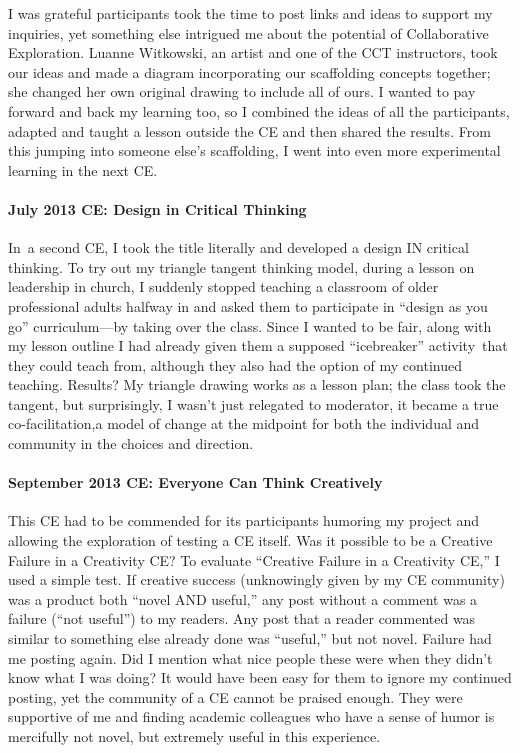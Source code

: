 I was grateful participants took the time to post links and ideas to
support my inquiries, yet something else intrigued me about the
potential of Collaborative Exploration. Luanne Witkowski, an artist and
one of the CCT instructors, took our ideas and made a diagram
incorporating our scaffolding concepts together; she changed her own
original drawing to include all of ours. I wanted to pay forward and
back my learning too, so I combined the ideas of all the participants,
adapted and taught a lesson outside the CE and then shared the results.
From this jumping into someone else's scaffolding, I went into even more
experimental learning in the next CE.

\paragraph{July 2013 CE: Design in Critical Thinking}

In~a second CE, I took the title literally and developed a design IN
critical thinking. To try out my triangle tangent thinking model, during
a lesson on leadership in church, I suddenly stopped teaching a
classroom of older professional adults halfway in and asked them to
participate in ``design as you go'' curriculum---by taking over the
class. Since I wanted to be fair, along with my lesson outline I had
already given them a supposed ``icebreaker'' activity~that they could
teach from, although they also had the option of my continued teaching.
Results? My triangle drawing works as a lesson plan; the class took the
tangent, but surprisingly, I wasn't just relegated to moderator, it
became a true co-facilitation,a model of change at the midpoint for both
the individual and community in the choices and direction.

\paragraph{September 2013 CE: Everyone Can Think Creatively}

This CE had to be commended for its participants humoring my project and
allowing the exploration of testing a CE itself. Was it possible to be a
Creative Failure in a Creativity CE? To evaluate ``Creative Failure in a
Creativity CE,'' I used a simple test. If creative success (unknowingly
given by my CE community) was a product both ``novel AND useful,'' any
post without a comment was a failure (``not useful'') to my readers. Any
post that a reader commented was similar to something else already done
was ``useful,'' but not novel. Failure had me posting again. Did I
mention what nice people these were when they didn't know what I was
doing? It would have been easy for them to ignore my continued posting,
yet the community of a CE cannot be praised enough. They were supportive
of me and finding academic colleagues who have a sense of humor is
mercifully not novel, but extremely useful in this experience.

